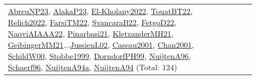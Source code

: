 {\begin{longtable}{p{3cm}r>{\raggedright\arraybackslash}p{6cm}>{\raggedright\arraybackslash}p{6cm}>{\raggedright\arraybackslash}p{8cm}}
\hyperref[detail:AbreuNP23]{AbreuNP23}, \hyperref[detail:AlakaP23]{AlakaP23}, \hyperref[detail:El-Kholany2022]{El-Kholany2022}, \hyperref[detail:TouatBT22]{TouatBT22}, \hyperref[detail:Relich2022]{Relich2022}, \hyperref[detail:FarsiTM22]{FarsiTM22}, \hyperref[detail:SvancaraB22]{SvancaraB22}, \hyperref[detail:FetgoD22]{FetgoD22}, \hyperref[detail:NaqviAIAAA22]{NaqviAIAAA22}, \hyperref[detail:Pinarbasi21]{Pinarbasi21}, \hyperref[detail:KletzanderMH21]{KletzanderMH21}, \hyperref[detail:GeibingerMM21]{GeibingerMM21}...\hyperref[detail:JussienL02]{JussienL02}, \hyperref[detail:Caseau2001]{Caseau2001}, \hyperref[detail:Chan2001]{Chan2001}, \hyperref[detail:SchildW00]{SchildW00}, \hyperref[detail:Stobbe1999]{Stobbe1999}, \hyperref[detail:DorndorfPH99]{DorndorfPH99}, \hyperref[detail:NuijtenA96]{NuijtenA96}, \hyperref[detail:Schaerf96]{Schaerf96}, \hyperref[detail:NuijtenA94a]{NuijtenA94a}, \hyperref[detail:NuijtenA94]{NuijtenA94} (Total: 124)\\
\end{longtable}
}

